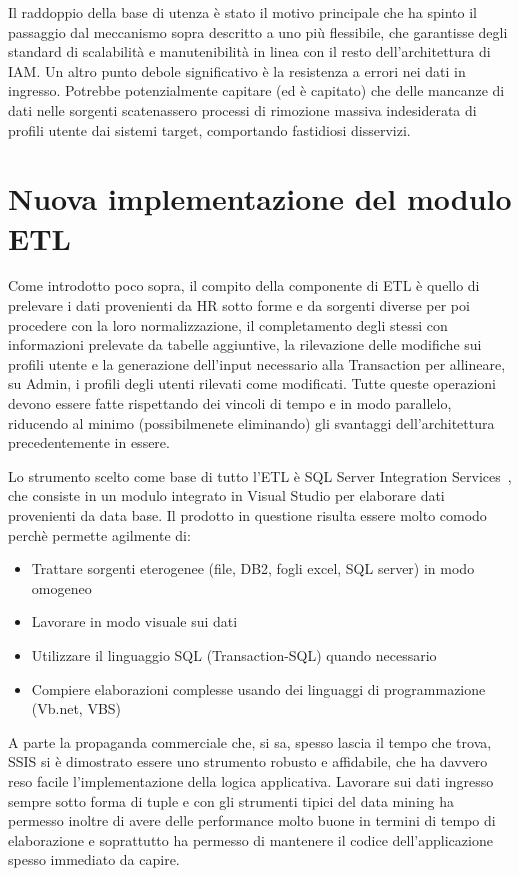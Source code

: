 Il raddoppio della base di utenza è stato il motivo principale che ha spinto il
passaggio dal meccanismo sopra descritto a uno più flessibile, che garantisse
degli standard di scalabilità e manutenibilità in linea con il resto
dell'architettura di IAM. 
Un altro punto debole significativo è la resistenza a errori nei dati in
ingresso. Potrebbe potenzialmente capitare (ed è capitato) che delle mancanze di
dati nelle sorgenti scatenassero processi di rimozione massiva indesiderata di
profili utente dai sistemi target, comportando fastidiosi disservizi.

\section{Nuova implementazione del modulo ETL}

Come introdotto poco sopra, il compito della componente di ETL è quello di
prelevare i dati provenienti da HR sotto forme e da sorgenti diverse per poi
procedere con la loro normalizzazione, il completamento degli stessi con
informazioni prelevate da tabelle aggiuntive, la rilevazione delle modifiche
sui profili utente e la generazione dell’input necessario alla Transaction per
allineare, su Admin, i profili degli utenti rilevati come modificati.   
Tutte queste operazioni devono essere fatte rispettando dei vincoli di tempo e
in modo parallelo, riducendo al minimo (possibilmenete eliminando) gli svantaggi
dell'architettura precedentemente in essere.

Lo strumento scelto come base di tutto l'ETL è SQL Server Integration
Services~\cite{SSIS}, che consiste in un modulo integrato in Visual Studio per
elaborare dati provenienti da data base.
Il prodotto in questione risulta essere molto comodo perchè permette agilmente
di:

\begin{itemize}
\item Trattare sorgenti eterogenee (file, DB2, fogli excel, SQL server) in modo
omogeneo
\item Lavorare in modo visuale sui dati 
\item Utilizzare il linguaggio SQL (Transaction-SQL) quando necessario
\item Compiere elaborazioni complesse usando dei linguaggi di programmazione
(Vb.net, VBS)
\end{itemize}

A parte la propaganda commerciale che, si sa, spesso lascia il tempo che trova,
SSIS si è dimostrato essere uno strumento robusto e affidabile, che ha davvero
reso facile l'implementazione della logica applicativa.
Lavorare sui dati ingresso sempre sotto forma di tuple e con gli strumenti
tipici del data mining ha permesso inoltre di avere delle performance molto
buone in termini di tempo di elaborazione e soprattutto ha permesso di mantenere
il codice dell'applicazione spesso immediato da capire.

